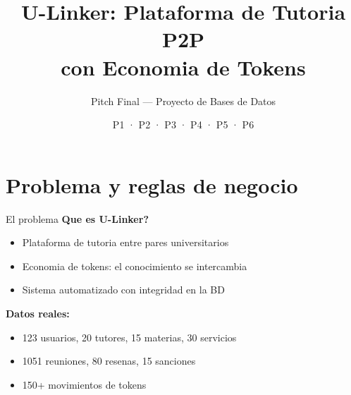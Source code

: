 ﻿\documentclass[11pt,aspectratio=169]{beamer}
\title[U-Linker Pitch]{U-Linker: Plataforma de Tutoria P2P \\ con Economia de Tokens}
\subtitle{Pitch Final --- Proyecto de Bases de Datos}
\author{P1 · P2 · P3 · P4 · P5 · P6}
\date{}
\begin{document}
\begin{frame}
    \titlepage
\end{frame}

\section{Problema y reglas de negocio}

\begin{frame}{El problema}
    \textbf{Que es U-Linker?}
    \begin{itemize}
        \item Plataforma de tutoria entre pares universitarios
        \item Economia de tokens: el conocimiento se intercambia
        \item Sistema automatizado con integridad en la BD
    \end{itemize}
    \vspace{0.3cm}
    \textbf{Datos reales:}
    \begin{itemize}
        \item 123 usuarios, 20 tutores, 15 materias, 30 servicios
        \item 1051 reuniones, 80 resenas, 15 sanciones
        \item 150+ movimientos de tokens
    \end{itemize}
\end{frame}
\end{document}

